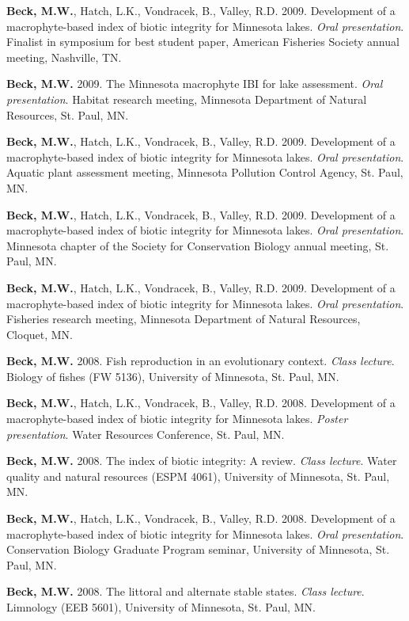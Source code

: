 \documentclass[letterpaper,12pt]{article}
\begin{document}
{\bf Beck, M.W.}, Hatch, L.K., Vondracek, B., Valley, R.D. 2009. Development of a macrophyte-based index of biotic integrity for Minnesota lakes. \textit{Oral presentation}. Finalist in symposium for best student paper, American Fisheries Society annual meeting, Nashville, TN.

{\bf Beck, M.W.} 2009. The Minnesota macrophyte IBI for lake assessment. \textit{Oral presentation}. Habitat research meeting, Minnesota Department of Natural Resources, St. Paul, MN.

{\bf Beck, M.W.}, Hatch, L.K., Vondracek, B., Valley, R.D. 2009. Development of a macrophyte-based index of biotic integrity for Minnesota lakes. \textit{Oral presentation}. Aquatic plant assessment meeting, Minnesota Pollution Control Agency, St. Paul, MN.

{\bf Beck, M.W.}, Hatch, L.K., Vondracek, B., Valley, R.D. 2009. Development of a macrophyte-based index of biotic integrity for Minnesota lakes. \textit{Oral presentation}. Minnesota chapter of the Society for Conservation Biology annual meeting, St. Paul, MN.

{\bf Beck, M.W.}, Hatch, L.K., Vondracek, B., Valley, R.D. 2009. Development of a macrophyte-based index of biotic integrity for Minnesota lakes. \textit{Oral presentation}. Fisheries research meeting, Minnesota Department of Natural Resources, Cloquet, MN.

{\bf Beck, M.W.} 2008. Fish reproduction in an evolutionary context. \textit{Class lecture}. Biology of fishes (FW 5136), University of Minnesota, St. Paul, MN.

{\bf Beck, M.W.}, Hatch, L.K., Vondracek, B., Valley, R.D. 2008. Development of a macrophyte-based index of biotic integrity for Minnesota lakes. \textit{Poster presentation}. Water Resources Conference, St. Paul, MN.

{\bf Beck, M.W.} 2008. The index of biotic integrity: A review. \textit{Class lecture}. Water quality and natural resources (ESPM 4061), University of Minnesota, St. Paul, MN.

{\bf Beck, M.W.}, Hatch, L.K., Vondracek, B., Valley, R.D. 2008. Development of a macrophyte-based index of biotic integrity for Minnesota lakes. \textit{Oral presentation}. Conservation Biology Graduate Program seminar, University of Minnesota, St. Paul, MN.

{\bf Beck, M.W.} 2008. The littoral and alternate stable states. \textit{Class lecture}. Limnology (EEB 5601), University of Minnesota, St. Paul, MN.
\end{document}
